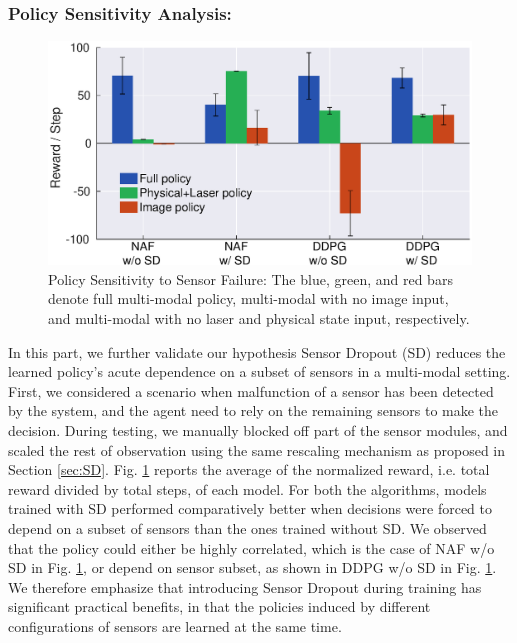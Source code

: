 \documentclass[../thesis.tex]{subfiles}
\begin{document}
\subsubsection{Policy Sensitivity Analysis:} \label{sec:policy}

\begin{figure}[t]
	\begin{center}
		\centerline{\includegraphics[width=0.8\columnwidth]{./MultimodalDRL/fig/policy}}
		\caption{Policy Sensitivity to Sensor Failure: The blue, green, and red bars denote full multi-modal policy, multi-modal with no image input, and multi-modal with no laser and physical state input, respectively.}
		\label{fig:policy_exp}
	\end{center}
\end{figure} 

In this part, we further validate our hypothesis Sensor Dropout (SD) reduces the learned policy's acute dependence on a subset of sensors in a multi-modal setting. First, we considered a scenario when malfunction of a sensor has been detected by the system, and the agent need to rely on the remaining sensors to make the decision. During testing, we manually blocked off part of the sensor modules, and scaled the rest of observation using the same rescaling mechanism as proposed in Section \ref{sec:SD}. Fig. \ref{fig:policy_exp} reports the average of the normalized reward, i.e. total reward divided by total steps, of each model. For both the algorithms, models trained with SD performed comparatively better when decisions were forced to depend on a subset of sensors than the ones trained without SD. We observed that the policy could either be highly correlated, which is the case of NAF w/o SD in Fig. \ref{fig:policy_exp}, or depend on sensor subset, as shown in DDPG w/o SD in Fig. \ref{fig:policy_exp}. We therefore emphasize that introducing Sensor Dropout during training has significant practical benefits, in that the policies induced by different configurations of sensors are learned at the same time. 
\end{document}
